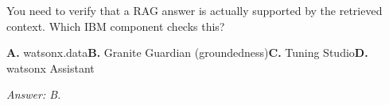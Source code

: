 \begin{practicebox}[title=\textbf{Q1.7 --- Guardian}]
You need to verify that a RAG answer is actually supported by the retrieved context. Which IBM component checks this?

\textbf{A.} watsonx.data\hspace{1em}\textbf{B.} Granite Guardian (groundedness)\hspace{1em}\textbf{C.} Tuning Studio\hspace{1em}\textbf{D.} watsonx Assistant

\vspace{0.2cm}\textit{Answer: B.}
\end{practicebox}

\cleardoublepage
